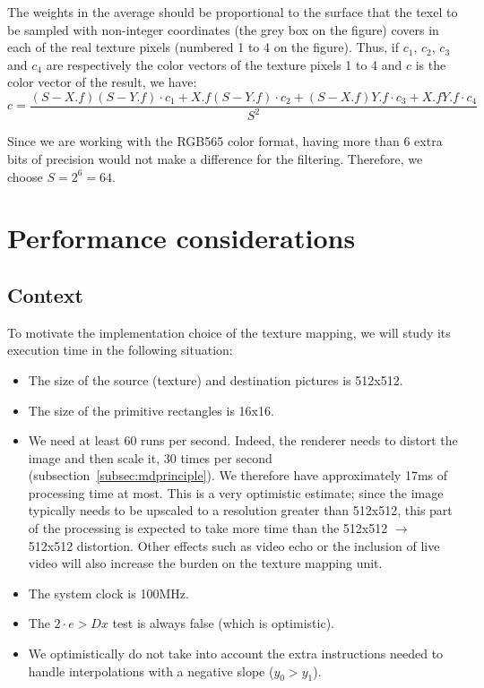\documentclass[a4paper,11pt]{kthesis}
\begin{document}
The weights in the average should be proportional to the surface that the texel to be sampled with non-integer coordinates (the grey box on the figure) covers in each of the real texture pixels (numbered 1 to 4 on the figure). Thus, if $c_{1}$, $c_{2}$, $c_{3}$ and $c_{4}$ are respectively the color vectors of the texture pixels 1 to 4 and $c$ is the color vector of the result, we have:
\begin{equation}
c = \frac{(S-X.f)(S-Y.f) \cdot c_{1} + X.f(S-Y.f) \cdot c_{2} + (S-X.f)Y.f \cdot c_{3} + X.fY.f \cdot c_{4}}{S^{2}}
\end{equation}

Since we are working with the RGB565 color format, having more than 6 extra bits of precision would not make a difference for the filtering. Therefore, we choose $S = 2^{6} = 64$.

\section{Performance considerations} %
\subsection{Context}
To motivate the implementation choice of the texture mapping, we will study its execution time in the following  situation:
\begin{itemize}
\item The size of the source (texture) and destination pictures is 512x512.
\item The size of the primitive rectangles is 16x16.
\item We need at least 60 runs per second. Indeed, the renderer needs to distort the image and then scale it, 30 times per second (subsection~\ref{subsec:mdprinciple}). We therefore have approximately 17ms of processing time at most. This is a very optimistic estimate; since the image typically needs to be upscaled to a resolution greater than 512x512, this part of the processing is expected to take more time than the 512x512 $\rightarrow$ 512x512 distortion. Other effects such as video echo or the inclusion of live video will also increase the burden on the texture mapping unit.
\item The system clock is 100MHz.
\item The $2\cdot e > Dx$ test is always false (which is optimistic).
\item We optimistically do not take into account the extra instructions needed to handle interpolations with a negative slope ($y_{0} > y_{1}$).
\end{itemize}
\end{document}
